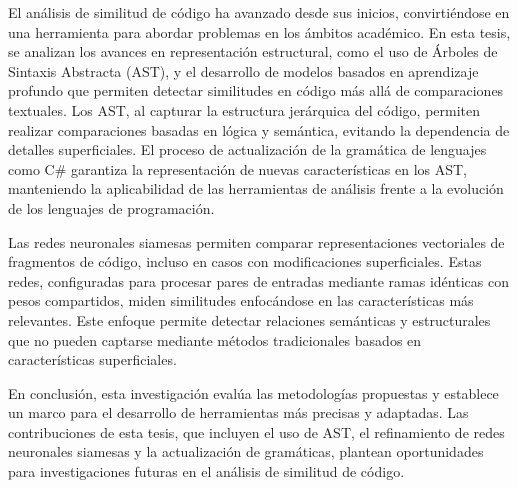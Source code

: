 \begin{conclusions}

El análisis de similitud de código ha avanzado desde sus inicios, convirtiéndose en una herramienta para abordar problemas en los ámbitos académico. En esta tesis, se analizan los avances en representación estructural, como el uso de Árboles de Sintaxis Abstracta (AST), y el desarrollo de modelos basados en aprendizaje profundo que permiten detectar similitudes en código más allá de comparaciones textuales. Los AST, al capturar la estructura jerárquica del código, permiten realizar comparaciones basadas en lógica y semántica, evitando la dependencia de detalles superficiales. El proceso de actualización de la gramática de lenguajes como C\# garantiza la representación de nuevas características en los AST, manteniendo la aplicabilidad de las herramientas de análisis frente a la evolución de los lenguajes de programación.

Las redes neuronales siamesas permiten comparar representaciones vectoriales de fragmentos de código, incluso en casos con modificaciones superficiales. Estas redes, configuradas para procesar pares de entradas mediante ramas idénticas con pesos compartidos, miden similitudes enfocándose en las características más relevantes. Este enfoque permite detectar relaciones semánticas y estructurales que no pueden captarse mediante métodos tradicionales basados en características superficiales.

En conclusión, esta investigación evalúa las metodologías propuestas y establece un marco para el desarrollo de herramientas más precisas y adaptadas. Las contribuciones de esta tesis, que incluyen el uso de AST, el refinamiento de redes neuronales siamesas y la actualización de gramáticas, plantean oportunidades para investigaciones futuras en el análisis de similitud de código.

\end{conclusions}
